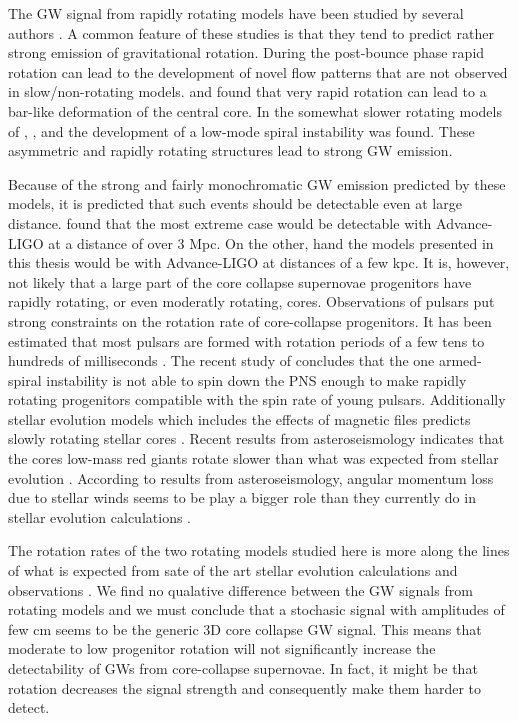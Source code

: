 The GW signal from rapidly rotating models have been studied 
by several authors \citep{mueller_82,rampp_98,shibata_05,ott_05,scheidegger_10,kuroda_14,takiwaki_16}. 
A common feature of these studies is that they tend to predict rather strong emission of
gravitational rotation. During the post-bounce phase rapid rotation can lead to the
development of novel flow patterns that are not observed in slow/non-rotating models.
\cite{rampp_98} and \cite{shibata_05} found that very rapid rotation can
lead to a bar-like deformation of the central core. In the somewhat slower 
rotating models of \cite{ott_05}, \cite{kuroda_14}, and \cite{takiwaki_16} the development of
a low-mode spiral instability was found. These asymmetric and rapidly rotating structures
lead to strong GW emission. 

Because of the strong and fairly monochromatic GW emission predicted by these models,
it is predicted that such events should be detectable even at large distance. \citep{gossan_15} found that the
most extreme case would be detectable with Advance-LIGO at a distance of over 3 Mpc. On the other, hand
the models presented in this thesis would be with Advance-LIGO at distances of a few kpc. 
It is, however, not likely that a large part of the core collapse supernovae progenitors
have rapidly rotating, or even moderatly rotating, cores. Observations of pulsars put
strong constraints on the rotation rate of core-collapse progenitors. It has been estimated that
most pulsars are formed with rotation periods of a few tens to hundreds of milliseconds \citep{vranesevic_04,popov_12,noutsos_13}.
The recent study of \cite{kazeroni_17} concludes that
the one armed-spiral instability \citep{ott_05,kuroda_14,takiwaki_16} is not able to spin 
down the PNS enough to make rapidly rotating progenitors compatible with the spin rate of young
pulsars. Additionally stellar evolution models which includes the effects of magnetic files predicts
slowly rotating stellar cores \citep{heger_05}. Recent results from asteroseismology \cite{beck_12,mosser_12} indicates
that the cores low-mass red giants rotate slower than what was expected from stellar evolution \citep{cantiello_14,deheuvels_14}.
According to results from asteroseismology, angular momentum loss due to stellar winds seems to be play a bigger role than they currently 
do in stellar evolution calculations \citep{cantiello_14}. 

The rotation rates of the two rotating models studied here is more along the lines of what 
is expected from sate of the art stellar evolution calculations \citep{heger_05} and observations 
\citep{beck_12,mosser_12,popov_12,noutsos_13,cantiello_14,deheuvels_14}. 
We find no qualative difference between the GW signals from rotating models and we must conclude that
a stochasic signal with amplitudes of few cm seems to be the generic 3D core collapse GW signal.
This means that moderate to low progenitor rotation will not significantly increase the detectability of 
GWs from core-collapse supernovae. In fact, it might be that rotation decreases the signal strength and consequently make them harder to detect. 




